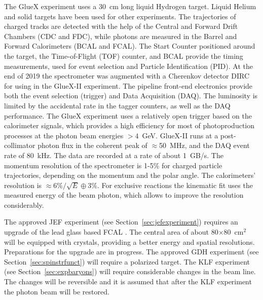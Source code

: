 The GlueX experiment uses a 30~cm long liquid Hydrogen target. Liquid Helium and solid targets have been used for other experiments. The trajectories of charged tracks are detected with the help of the Central and Forward Drift Chambers (CDC and FDC), while photons are measured in the Barrel and Forward Calorimeters (BCAL and FCAL). The Start Counter positioned around the target, the Time-of-Flight (TOF) counter, and BCAL provide the timing measurements, used for event selection and Particle Identification (PID). At the end of 2019 the spectrometer was augmented with a Cherenkov detector DIRC~\cite{Ali:2020erv} for using in the GlueX-II experiment. The pipeline front-end electronics provide both the event selection (trigger) and Data Acquisition (DAQ). The luminosity is limited by the accidental rate in the tagger counters, as well as the DAQ performance. The GlueX experiment uses a relatively open trigger based on the calorimeter signals, which provides a high efficiency for most of photoproduction processes at the photon beam energies $>4$~GeV. GlueX-II runs at a post-collimator photon flux in the coherent peak of ${\approx}$50~MHz, and the DAQ event rate of 80~kHz. The data are recorded at a rate of about 1~GB/s. The momentum resolution of the spectrometer is 1-5\% for charged particle trajectories, depending on the momentum and the polar angle. The calorimeters' resolution is ${\approx}6\%/\sqrt{E}\oplus{}3\%$. For exclusive reactions the kinematic fit uses the measured energy of the beam photon, which allows to improve the resolution considerably.

The approved JEF experiment (see Section~\ref{sec:jefexperiment}) requires an upgrade of the lead glass based FCAL . The central area of about 80$\times$80~cm$^2$ will be equipped with crystals, providing a better energy and spatial resolutions. Preparations for the upgrade are in progress. The approved GDH experiment (see Section~\ref{sec:spinstrfunct}) will require a polarized target. The KLF experiment (see Section~\ref{sec:expbaryons}) will require considerable changes in the beam line. The changes will be reversible and it is assumed that after the KLF experiment the photon beam will be restored.
